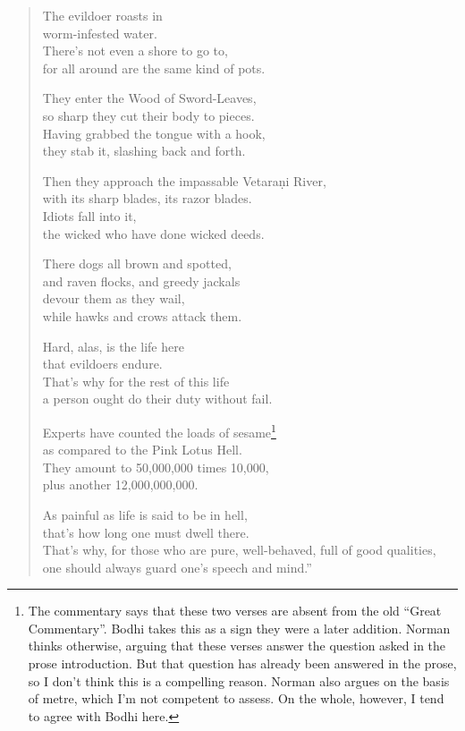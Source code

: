 \documentclass[12pt,openany]{book}%
\begin{document}
\begin{verse}
The evildoer roasts in \\
worm-infested water. \\
There’s not even a shore to go to, \\
for all around are the same kind of pots. 

They enter the Wood of Sword-Leaves, \\
so sharp they cut their body to pieces. \\
Having grabbed the tongue with a hook, \\
they stab it, slashing back and forth. 

Then they approach the impassable  \textsanskrit{Vetaraṇi} River, \\
with its sharp blades, its razor blades. \\
Idiots fall into it, \\
the wicked who have done wicked deeds. 

There dogs all brown and spotted, \\
and raven flocks, and greedy jackals \\
devour them as they wail, \\
while hawks and crows attack them. 

Hard, alas, is the life here \\
that evildoers endure. \\
That’s why for the rest of this life \\
a person ought do their duty without fail. 

Experts have counted the loads of sesame\footnote{The commentary says that these two verses are absent from the old “Great Commentary”. Bodhi takes this as a sign they were a later addition. Norman thinks otherwise, arguing that these verses answer the question asked in the prose introduction. But that question has already been answered in the prose, so I don’t think this is a compelling reason. Norman also argues on the basis of metre, which I’m not competent to assess. On the whole, however, I tend to agree with Bodhi here. } \\
as compared to the Pink Lotus Hell. \\
They amount to 50,000,000 times 10,000, \\
plus another 12,000,000,000. 

As painful as life is said to be in hell, \\
that’s how long one must dwell there. \\
That’s why, for those who are pure, well-behaved, full of good qualities, \\
one should always guard one’s speech and mind.” 

%
\end{verse}
\end{document}
